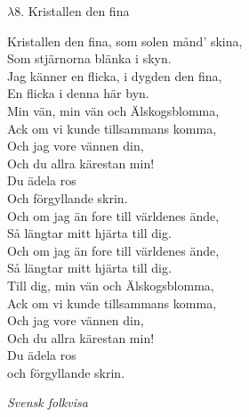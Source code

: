 \documentclass[a6paper,10pt]{article}
\newcommand{\notis}[1]{\begin{flushright}\textit{#1}\end{flushright}}
\begin{document}
\setlength{\oddsidemargin}{-0.47in}
\noindent
\begin{center}
\Large $\lambda8$. Kristallen den fina\\
\end{center}
Kristallen den fina, som solen månd' skina,\\
Som stjärnorna blänka i skyn.\\
Jag känner en flicka, i dygden den fina,\\
En flicka i denna här byn.
\vspace{5pt}\\
Min vän, min vän och Älskogsblomma,\\
Ack om vi kunde tillsammans komma,\\
Och jag vore vännen din,\\
Och du allra kärestan min!\\
Du ädela ros\\
Och förgyllande skrin.
\vspace{5pt}\\
Och om jag än fore till världenes ände,\\
Så längtar mitt hjärta till dig.\\
Och om jag än fore till världenes ände,\\
Så längtar mitt hjärta till dig.
\vspace{5pt}\\
Till dig, min vän och Älskogsblomma,\\
Ack om vi kunde tillsammans komma,\\
Och jag vore vännen din,\\
Och du allra kärestan min!\\
Du ädela ros\\
och förgyllande skrin. 
\notis{Svensk folkvisa}
\end{document}

